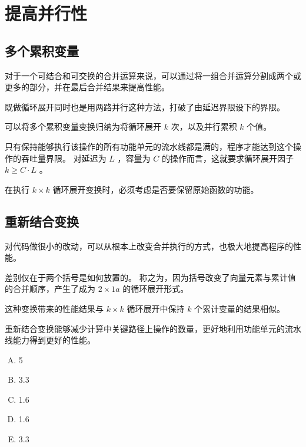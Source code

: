 
\section{提高并行性}
{
    \subsection{多个累积变量}
    {
        对于一个可结合和可交换的合并运算来说，可以通过将一组合并运算分割成两个或更多的部分，并在最后合并结果来提高性能。

        既做循环展开同时也是用两路并行这种方法，打破了由延迟界限设下的界限。

        可以将多个累积变量变换归纳为将循环展开 $k$ 次，以及并行累积 $k$ 个值。

        只有保持能够执行该操作的所有功能单元的流水线都是满的，程序才能达到这个操作的吞吐量界限。
        对延迟为 $L$ ，容量为 $C$ 的操作而言，这就要求循环展开因子 $k \geq C \cdot L$ 。

        在执行 $k \times k$ 循环展开变换时，必须考虑是否要保留原始函数的功能。
    }

    \subsection{重新结合变换}
    {
        对代码做很小的改动，可以从根本上改变合并执行的方式，也极大地提高程序的性能。

        差别仅在于两个括号是如何放置的。
        称之为，因为括号改变了向量元素与累计值的合并顺序，产生了成为 $2 \times 1a$ 的循环展开形式。

        这种变换带来的性能结果与 $k \times k$ 循环展开中保持 $k$ 个累计变量的结果相似。

        重新结合变换能够减少计算中关键路径上操作的数量，更好地利用功能单元的流水线能力得到更好的性能。

        \begin{practicec}
            \begin{enumerate}[A.]
                \item 5
                \item 3.3
                \item 1.6
                \item 1.6
                \item 3.3
            \end{enumerate}
        \end{practicec}
    }
}
